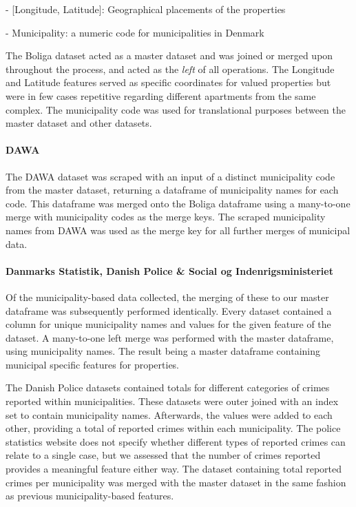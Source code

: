 \documentclass[12pt,a4paper]{article}
\begin{document}
-	[Longitude, Latitude]: Geographical placements of the properties

-	Municipality: a numeric code for municipalities in Denmark

The Boliga dataset acted as a master dataset and was joined or merged upon throughout the process, and acted as the \textit{left} of all operations. The Longitude and Latitude features served as specific coordinates for valued properties but were in few cases repetitive regarding different apartments from the same complex. The municipality code was used for translational purposes between the master dataset and other datasets.  

\paragraph{DAWA\newline}
The DAWA dataset was scraped with an input of a distinct municipality code from the master dataset, returning a dataframe of municipality names for each code. This dataframe was merged onto the Boliga dataframe using a many-to-one merge with municipality codes as the merge keys. The scraped municipality names from DAWA was used as the merge key for all further merges of municipal data. 

\paragraph{Danmarks Statistik, Danish Police \& Social og Indenrigsministeriet\newline}
Of the municipality-based data collected, the merging of these to our master dataframe was subsequently performed identically. Every dataset contained a column for unique municipality names and values for the given feature of the dataset. A many-to-one left merge was performed with the master dataframe, using municipality names. The result being a master dataframe containing municipal specific features for properties. 

The Danish Police datasets contained totals for different categories of crimes reported within municipalities. These datasets were outer joined with an index set to contain municipality names. Afterwards, the values were added to each other, providing a total of reported crimes within each municipality. The police statistics website does not specify whether different types of reported crimes can relate to a single case, but we assessed that the number of crimes reported provides a meaningful feature either way. The dataset containing total reported crimes per municipality was merged with the master dataset in the same fashion as previous municipality-based features. 
\end{document}
